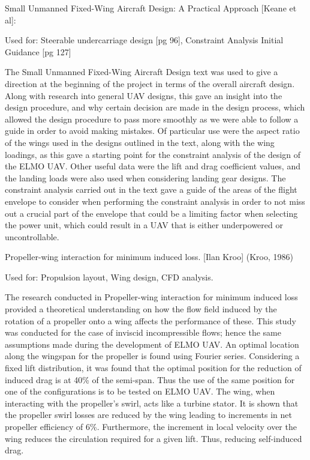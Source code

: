 \documentclass[../../main.tex]{subfiles}
\begin{document}
Small Unmanned Fixed-Wing Aircraft Design: A Practical Approach [Keane et al]: 

Used for: Steerable undercarriage design [pg 96], Constraint Analysis Initial Guidance [pg 127]  

The Small Unmanned Fixed-Wing Aircraft Design text was used to give a direction at the beginning of the project in terms of the overall aircraft design.
Along with research into general UAV designs, this gave an insight into the design procedure, and why certain decision are made in the design process, which allowed the design procedure to pass more smoothly as we were able to follow a guide in order to avoid making mistakes.
Of particular use were the aspect ratio of the wings used in the designs outlined in the text, along with the wing loadings, as this gave a starting point for the constraint analysis of the design of the ELMO UAV.
Other useful data were the lift and drag coefficient values, and the landing loads were also used when considering landing gear designs.
The constraint analysis carried out in the text gave a guide of the areas of the flight envelope to consider when performing the constraint analysis in order to not miss out a crucial part of the envelope that could be a limiting factor when selecting the power unit, which could result in a UAV that is either underpowered or uncontrollable. 

Propeller-wing interaction for minimum induced loss. [Ilan Kroo] (Kroo, 1986) 

Used for: Propulsion layout, Wing design, CFD analysis. 

The research conducted in Propeller-wing interaction for minimum induced loss provided a theoretical understanding on how the flow field induced by the rotation of a propeller onto a wing affects the performance of these.
This study was conducted for the case of inviscid incompressible flows; hence the same assumptions made during the development of ELMO UAV.
An optimal location along the wingspan for the propeller is found using Fourier series.
Considering a fixed lift distribution, it was found that the optimal position for the reduction of induced drag is at 40\% of the semi-span.
Thus the use of the same position for one of the configurations is to be tested on ELMO UAV.
The wing, when interacting with the propeller’s swirl, acts like a turbine stator.
It is shown that the propeller swirl losses are reduced by the wing leading to increments in net propeller efficiency of 6\%.
Furthermore, the increment in local velocity over the wing reduces the circulation required for a given lift.
Thus, reducing self-induced drag. 
\end{document}
